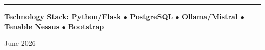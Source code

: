 \begin{titlepage}
\begin{center}
\vspace{0.5cm}
\rule{\linewidth}{1pt}

\vspace{0.3cm}
{\small\bfseries\color{ISIblue}
Technology Stack: \quad
\textcolor{ISIblue}{Python/Flask} \quad$\bullet$\quad
\textcolor{ISIblue}{PostgreSQL} \quad$\bullet$\quad
\textcolor{ISIblue}{Ollama/Mistral} \quad$\bullet$\quad
\textcolor{ISIblue}{Tenable Nessus} \quad$\bullet$\quad
\textcolor{ISIblue}{Bootstrap}
}

\vspace{0.2cm}
{\small\color{ISIgray} June 2026}

\end{center}
\end{titlepage}
\cleardoublepage
